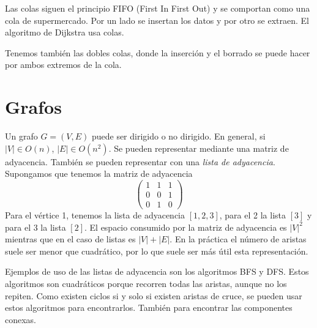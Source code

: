 \documentclass[AL.tex]{subfiles}
\begin{document}
Las colas siguen el principio FIFO (First In First Out) y se comportan como una cola de supermercado. Por un lado se insertan los datos y por otro se extraen. El algoritmo de Dijkstra usa colas. 

Tenemos también las dobles colas, donde la inserción y el borrado se puede hacer por ambos extremos de la cola. 

\section{Grafos}
Un grafo $G=(V,E)$ puede ser dirigido o no dirigido. En general, si $|V|\in O(n)$, $|E|\in O(n^2)$. Se pueden representar mediante una matriz de adyacencia. También se pueden representar con una \emph{lista de adyacencia}. Supongamos que tenemos la matriz de adyacencia 
$$\begin{pmatrix}
1 & 1 & 1\\
0 & 0 & 1\\
0 & 1 & 0
\end{pmatrix}$$
Para el vértice 1, tenemos la lista de adyacencia $[1,2,3]$, para el 2 la lista $[3]$ y para el 3 la lista $[2]$. El espacio consumido por la matriz de adyacencia es $|V|^2$ mientras que en el caso de listas es $|V|+|E|$. En la práctica el número de aristas suele ser menor que cuadrático, por lo que suele ser más útil esta representación. 

Ejemplos de uso de las listas de adyacencia son los algoritmos BFS y DFS. Estos algoritmos son cuadráticos porque recorren todas las aristas, aunque no los repiten. Como existen ciclos si y solo si existen aristas de cruce, se pueden usar estos algoritmos para encontrarlos. También para encontrar las componentes conexas.
\end{document}
